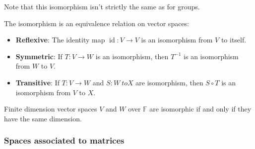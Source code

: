 Note that this isomorphism isn't strictly the same as for groups.

The isomorphism is an equivalence relation on vector spaces:
\begin{itemize}
	\item \textbf{Reflexive}: The identity map $\operatorname{id} : V \to V$ is an isomorphism from $V$ to itself.
	\item \textbf{Symmetric}: If $T : V \to W$ is an isomorphism, then $T^{-1}$ is an isomorphism from $W$ to $V$.
	\item \textbf{Transitive}: If $T : V \to W$ and $S : W \ to X$ are isomorphism, then $S \circ T$ is an isomorphism from $V$ to $X$.
\end{itemize}

\begin{theorem}{\cite{math2601_notes}}{}
	Finite dimension vector spaces $V$ and $W$ over $\mathbb{F}$ are isomorphic if and only if they have the same dimension.
\end{theorem}

\subsubsection{Spaces associated to matrices}

